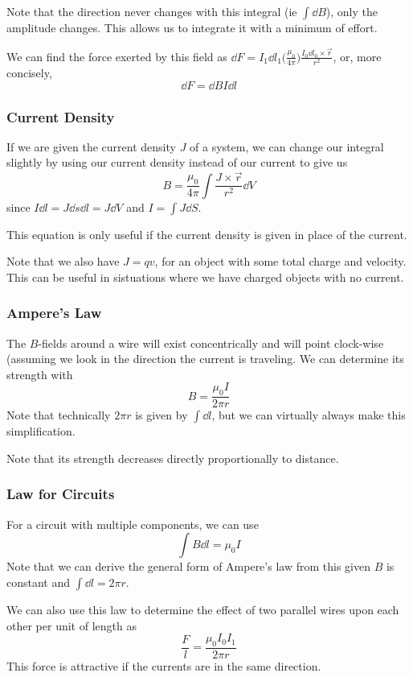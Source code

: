 \documentclass[12pt]{article}
\newcommand{\inint}[2]{\int #1 \dd #2}
\begin{document}
Note that the direction never changes with this integral (ie $\int \dd B$), only the amplitude changes. This allows us to integrate it with a minimum of effort.

We can find the force exerted by this field as $\dd F = I_1 \dd l_1 \bigl( \frac{\mu_0}{4\pi} \bigl) \frac{I_0 \dd l_0 \times \vec{r}}{r^2}$, or, more concisely, \[ \dd F = \dd B I \dd l \]

\subsubsection*{Current Density}
If we are given the current density $J$ of a system, we can change our integral slightly by using our current density instead of our current to give us \[ B = \frac{\mu_0}{4\pi} \inint{\frac{J \times \vec{r}}{r^2}}{V} \] since $I \dd l = J \dd s \dd l = J \dd V$ and $I = \inint{J}{S}$.

This equation is only useful if the current density is given in place of the current.

Note that we also have $J = qv$, for an object with some total charge and velocity. This can be useful in sistuations where we have charged objects with no current.

\subsubsection*{Ampere's Law}
The $B$-fields around a wire will exist concentrically and will point clock-wise (assuming we look in the direction the current is traveling. We can determine its strength with \[ B = \frac{\mu_0 I}{2\pi r} \] Note that technically $2\pi r$ is given by $\int \dd l$, but we can virtually always make this simplification.

Note that its strength decreases directly proportionally to distance.

\subsubsection*{Law for Circuits}
For a circuit with multiple components, we can use \[ \inint{B}{l} = \mu_0 I \] Note that we can derive the general form of Ampere's law from this given $B$ is constant and $\int \dd l = 2\pi r$.

We can also use this law to determine the effect of two parallel wires upon each other per unit of length as \[ \frac{F}{l} = \frac{\mu_0 I_0 I_1}{2\pi r} \] This force is attractive if the currents are in the same direction.
\end{document}
